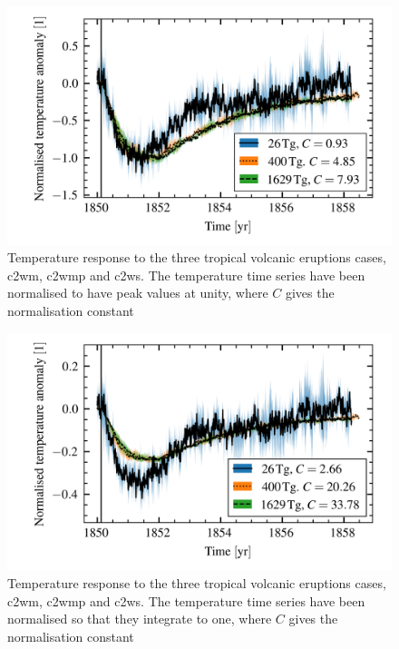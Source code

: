 \documentclass{ametsocV5}
\begin{document}
\begin{figure}[t]
  \begin{center}
    \includegraphics[width=0.95\linewidth]{figures/compare-waveform-max.png}
  \end{center}
  \caption{Temperature response to the three tropical volcanic eruptions cases,
    \ac{c2wm}, \ac{c2wmp} and \ac{c2ws}. The temperature time series have been
    normalised to have peak values at unity, where \(C\) gives the normalisation
    constant}%
  \label{fig:temp_norm_max}
\end{figure}

\begin{figure}[t]
  \begin{center}
    \includegraphics[width=0.95\linewidth]{figures/compare-waveform-integrate.png}
  \end{center}
  \caption{Temperature response to the three tropical volcanic eruptions cases,
    \ac{c2wm}, \ac{c2wmp} and \ac{c2ws}. The temperature time series have been normalised
    so that they integrate to one, where \(C\) gives the normalisation constant}%
  \label{fig:temp_norm_int}
\end{figure}
\end{document}
